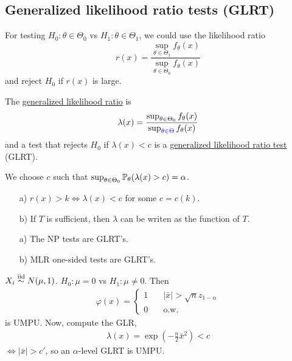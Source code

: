 \subsection{Generalized likelihood ratio tests (GLRT)}
\begin{mydef}
	For testing $H_0: \theta\in \Theta_0$ vs $H_1: \theta \in \Theta_1$, we could use the likelihood ratio
	$$r(x) = \frac{ \sup_{\theta \in \Theta_1} f_\theta(x) }{ \sup_{\theta \in \Theta_0} f_\theta(x) }$$
	and reject $H_0$ if $r(x)$ is large.
\end{mydef}

\begin{mydef}
	The \uline{generalized likelihood ratio} is
	\begin{align*}
		\lambda(x) = \frac{ \sup_{\theta \in \Theta_0} f_\theta(x) }{ \sup_{{\color{blue} \theta \in \Theta}} f_\theta(x) }
	\end{align*}
	and a test that rejects $H_0$ if $\lambda(x)<c$ is a \uline{generalized likelihood ratio test} (GLRT).
\end{mydef}
\begin{remark}
	We choose $c$ such that $\sup_{\theta\in \Theta_0} \mathbb{P}_\theta(\lambda(x)>c) =\alpha$.
\end{remark}

\begin{prop}\textbf{ }
	\begin{enumerate}
		\item[a)] $r(x)> k \iff \lambda(x)< c$ for some $c = c(k)$. 
		
		\item[b)] If $T$ is sufficient, then $\lambda$ can be writen as the function of $T$.
	\end{enumerate}
\end{prop}

\begin{prop}\textbf{ }
	\begin{enumerate}
		\item[a)] The NP tests are GLRT's.
		
		\item[b)] MLR one-sided tests are GLRT's.
	\end{enumerate}
\end{prop}

\begin{exap}
	$X_i \stackrel{\text{iid}}{\sim} N(\mu,1)$. $H_0: \mu=0$ vs $H_1: \mu \neq 0$. Then
	\begin{align*}
		\varphi(x) = \begin{cases}
		1 &\quad |\bar{x}|>\sqrt{n}z_{1-\alpha}  \\
		0 &\quad \text{o.w.}
		\end{cases}
	\end{align*}
	is UMPU. Now, compute the GLR,
	\begin{align*}
		\lambda(x) = \exp( -\frac{n}{2} \bar{x}^2 ) < c
	\end{align*}
	$\iff |\bar{x}|> c'$, so an $\alpha$-level GLRT is UMPU.
\end{exap}

